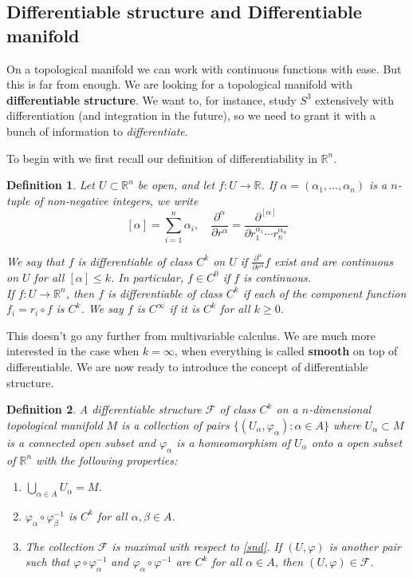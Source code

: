 \documentclass[twoside]{article}
\newtheorem{definition}{Definition}
\begin{document}
			\subsection{Differentiable structure and Differentiable manifold}
			On a topological manifold we can work with continuous functions with ease. But this is far from enough. We are looking for a topological manifold with \textbf{differentiable structure}. We want to, for instance, study $S^3$ extensively with differentiation (and integration in the future), so we need to grant it with a bunch of information to \textit{differentiate}.
			
			To begin with we first recall our definition of differentiability in $\mathbb{R}^n$. 
			
			\begin{definition}
				Let $U \subset \mathbb{R}^n$ be open, and let $f:U \to \mathbb{R}$. If $\alpha = (\alpha_1,\dots,\alpha_n)$ is a $n$-tuple of non-negative integers, we write
				\[
					[\alpha]= \sum_{i=1}^{n}\alpha_i, \quad \frac{\partial^\alpha}{\partial r^\alpha} = \frac{\partial^{[\alpha]}}{\partial r_1^{\alpha_1} \cdots r_n^{\alpha_n}}
				\]
				
				We say that $f$ is differentiable of class $C^k$ on $U$ if $\frac{\partial^\alpha}{\partial r^\alpha}f$ exist and are continuous on $U$ for all $[\alpha] \le k$. In particular, $f \in C^0$ if $f$ is continuous. \\
				If $f:U \to \mathbb{R}^n$, then $f$ is differentiable of class $C^k$ if each of the component function $f_i = r_i \circ f$ is $C^k$. We say $f$ is $C^\infty$ if it is $C^k$ for all $k \ge 0$.
			\end{definition}
		
			This doesn't go any further from multivariable calculus. We are much more interested in the case when $k=\infty$, when everything is called \textbf{smooth} on top of differentiable. We are now ready to introduce the concept of differentiable structure.
			
			\begin{definition}
				A \textit{differentiable structure} $\mathscr{F}$ of class $C^k$ on a $n$-dimensional topological manifold $M$ is a collection of pairs $\{(U_\alpha,\varphi_\alpha):\alpha \in A\}$ where $U_\alpha \subset M$ is a connected open subset and $\varphi_\alpha$ is a homeomorphism of $U_\alpha$ onto a open subset of $\mathbb{R}^n$ with the following properties:
				\begin{enumerate}
					\item $\bigcup_{\alpha \in A}U_\alpha = M$. \label{fst}
					\item $\varphi_\alpha \circ \varphi_\beta^{-1}$ is $C^k$ for all $\alpha, \beta \in A$. \label{snd}
					\item The collection $\mathscr{F}$ is maximal with respect to \ref{snd}. If $(U,\varphi)$ is another pair such that $\varphi \circ \varphi_\alpha^{-1}$ and $\varphi_\alpha \circ \varphi^{-1}$ are $C^k$ for all $\alpha \in A$, then $(U,\varphi) \in \mathscr{F}$.
				\end{enumerate}
			\end{definition}
			
\end{document}
